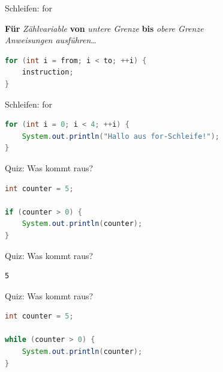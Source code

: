 \documentclass[18pt]{beamer}
\begin{document}
\begin{frame}[fragile]{Schleifen: for}
    \begin{block}{}
        \textbf{Für} \textit{Zählvariable} \textbf{von} \textit{untere Grenze} \textbf{bis} \textit{obere Grenze}\\
        \textit{Anweisungen ausführen}\dots
    \end{block}
    \pause

    \begin{block}{}
        \begin{lstlisting}[language=Java]
for (int i = from; i < to; ++i) {
    instruction;
}
        \end{lstlisting}
    \end{block}
\end{frame}

\begin{frame}[fragile]{Schleifen: for}
    \begin{exampleblock}{}
    \begin{lstlisting}[language=Java]
for (int i = 0; i < 4; ++i) {
    System.out.println("Hallo aus for-Schleife!");
}
    \end{lstlisting}
    \end{exampleblock}
\end{frame}
\begin{frame}[fragile]{Quiz: Was kommt raus?}
    \begin{exampleblock}{}
        \begin{lstlisting}[language=Java]
int counter = 5;

if (counter > 0) {
    System.out.println(counter);
}
        \end{lstlisting}
    \end{exampleblock}
\end{frame}

\begin{frame}[fragile]{Quiz: Was kommt raus?}
    \begin{block}{}
        \begin{lstlisting}
5
        \end{lstlisting}
    \end{block}
\end{frame}
\begin{frame}[fragile]{Quiz: Was kommt raus?}
    \begin{exampleblock}{}
        \begin{lstlisting}[language=Java]
int counter = 5;

while (counter > 0) {
    System.out.println(counter);
}
        \end{lstlisting}
    \end{exampleblock}
\end{frame}
\end{document}
